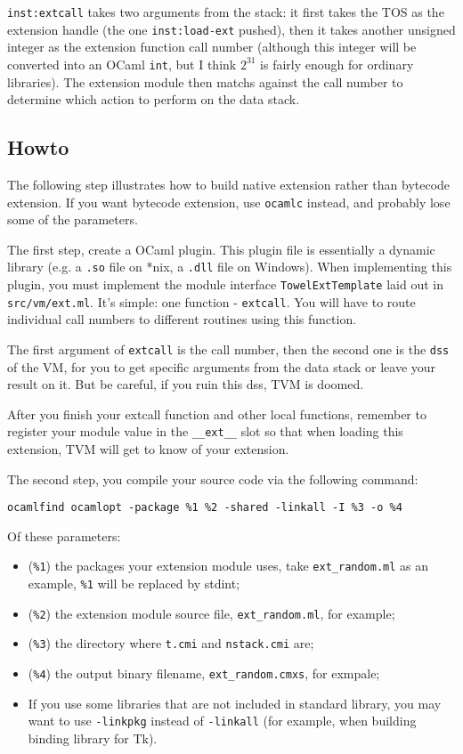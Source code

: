 \documentclass{article}
\newcommand{\inst}[1] {\texttt{inst:#1}}
\begin{document}
\inst{extcall} takes two arguments from the stack: it first takes the TOS as the extension handle (the one \inst{load-ext} pushed), then it takes another unsigned integer as the extension function call number (although this integer will be converted into an OCaml \texttt{int}, but I think $2^{31}$ is fairly enough for ordinary libraries). The extension module then matchs against the call number to determine which action to perform on the data stack.

\subsection{Howto}

The following step illustrates how to build native extension rather than bytecode extension. If you want bytecode extension, use \texttt{ocamlc} instead, and probably lose some of the parameters.

The first step, create a OCaml plugin. This plugin file is essentially a dynamic library (e.g. a \texttt{.so} file on *nix, a \texttt{.dll} file on Windows). When implementing this plugin, you must implement the module interface \texttt{TowelExtTemplate} laid out in \texttt{src/vm/ext.ml}. It's simple: one function - \texttt{extcall}. You will have to route individual call numbers to different routines using this function.

The first argument of \texttt{extcall} is the call number, then the second one is the \texttt{dss} of the VM, for you to get specific arguments from the data stack or leave your result on it. But be careful, if you ruin this dss, TVM is doomed.

After you finish your extcall function and other local functions, remember to register your module value in the \texttt{\_\_ext\_\_} slot so that when loading this extension, TVM will get to know of your extension.

The second step, you compile your source code via the following command:\newline

\texttt{ocamlfind ocamlopt -package \%1 \%2 -shared -linkall -I \%3 -o \%4}
\newline

Of these parameters:
\begin{itemize}
\item (\texttt{\%1}) the packages your extension module uses, take \texttt{ext\_random.ml} as an example, \texttt{\%1} will be replaced by stdint;
\item (\texttt{\%2}) the extension module source file, \texttt{ext\_random.ml}, for example;
\item (\texttt{\%3}) the directory where \texttt{t.cmi} and \texttt{nstack.cmi} are;
\item (\texttt{\%4}) the output binary filename, \texttt{ext\_random.cmxs}, for exmpale;
\item If you use some libraries that are not included in standard library, you may want to use \texttt{-linkpkg} instead of \texttt{-linkall} (for example, when building binding library for Tk).
\end{itemize}
\end{document}
